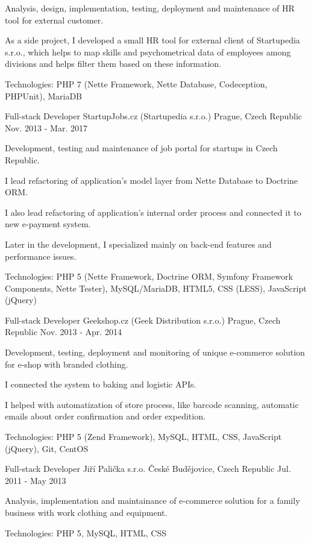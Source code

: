 \begin{cventries}
    {
      \begin{cvitems}
        \item {Analysis, design, implementation, testing, deployment and maintenance of HR tool for external customer.}
        \item {As a side project, I developed a small HR tool for external client of Startupedia s.r.o., which helps to map skills and psychometrical data of employees among divisions and helps filter them based on these information.}
        \item {Technologies: PHP 7 (Nette Framework, Nette Database, Codeception, PHPUnit), MariaDB}
      \end{cvitems}
    }
  \cventry
    {Full-stack Developer}
    {StartupJobs.cz (Startupedia s.r.o.)}
    {Prague, Czech Republic}
    {Nov. 2013 - Mar. 2017}
    {
      \begin{cvitems}
        \item {Development, testing and maintenance of job portal for startups in Czech Republic.}
        \item {I lead refactoring of application's model layer from Nette Database to Doctrine ORM.}
        \item {I also lead refactoring of application's internal order process and connected it to new e-payment system.}
        \item {Later in the development, I specialized mainly on back-end features and performance issues.}
        \item {Technologies: PHP 5 (Nette Framework, Doctrine ORM, Symfony Framework Components, Nette Tester), MySQL/MariaDB, HTML5, CSS (LESS), JavaScript (jQuery)}
      \end{cvitems}
    }
  \cventry
    {Full-stack Developer}
    {Geekshop.cz (Geek Distribution s.r.o.)}
    {Prague, Czech Republic}
    {Nov. 2013 - Apr. 2014}
    {
      \begin{cvitems}
        \item {Development, testing, deployment and monitoring of unique e-commerce solution for e-shop with branded clothing.}
        \item {I connected the system to baking and logistic APIs.}
        \item {I helped with automatization of store process, like barcode scanning, automatic emails about order confirmation and order expedition.}
        \item {Technologies: PHP 5 (Zend Framework), MySQL, HTML, CSS, JavaScript (jQuery), Git, CentOS}
      \end{cvitems}
    }
  \cventry
    {Full-stack Developer}
    {Jiří Palička s.r.o.}
    {České Budějovice, Czech Republic}
    {Jul. 2011 - May 2013}
    {
      \begin{cvitems}
        \item {Analysis, implementation and maintainance of e-commerce solution for a family business with work clothing and equipment.}
        \item {Technologies: PHP 5, MySQL, HTML, CSS}
      \end{cvitems}
    }
\end{cventries}
